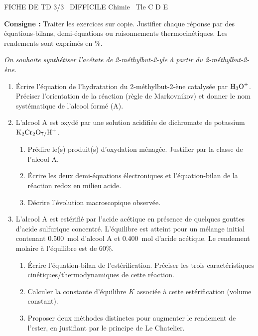 \documentclass[11pt]{article}
\begin{document}
\begin{tcolorbox}[enhanced,colback=popink,colframe=popink,arc=10pt,boxrule=0pt,left=12pt,right=12pt,top=9pt,bottom=9pt]
{\color{white}\popxbold\small FICHE DE TD 3/3 \textbullet\ DIFFICILE \hfill Chimie \textbullet\ Tle C D E\par}
\end{tcolorbox}
\vspace{4pt}
\noindent\textbf{Consigne :} Traiter les exercices sur copie. Justifier chaque réponse par des équations-bilans, demi-équations ou raisonnements thermocinétiques. Les rendements sont exprimés en \%.

\begin{exercice}
\emph{On souhaite synthétiser l'acétate de 2-méthylbut-2-yle à partir du 2-méthylbut-2-ène.}
\begin{enumerate}
    \item Écrire l'équation de l'hydratation du 2-méthylbut-2-ène catalysée par $\ce{H3O+}$. Préciser l'orientation de la réaction (règle de Markovnikov) et donner le nom systématique de l'alcool formé (A).
    \item L'alcool A est oxydé par une solution acidifiée de dichromate de potassium $\ce{K2Cr2O7/H+}$.
    \begin{enumerate}
        \item Prédire le(s) produit(s) d'oxydation ménagée. Justifier par la classe de l'alcool A.
        \item Écrire les deux demi-équations électroniques et l'équation-bilan de la réaction redox en milieu acide.
        \item Décrire l'évolution macroscopique observée.
    \end{enumerate}
    \item L'alcool A est estérifié par l'acide acétique en présence de quelques gouttes d'acide sulfurique concentré. L'équilibre est atteint pour un mélange initial contenant \SI{0,500}{mol} d'alcool A et \SI{0,400}{mol} d'acide acétique. Le rendement molaire à l'équilibre est de 60\%.
    \begin{enumerate}
        \item Écrire l'équation-bilan de l'estérification. Préciser les trois caractéristiques cinétiques/thermodynamiques de cette réaction.
        \item Calculer la constante d'équilibre $K$ associée à cette estérification (volume constant).
        \item Proposer deux méthodes distinctes pour augmenter le rendement de l'ester, en justifiant par le principe de Le Chatelier.
    \end{enumerate}
\end{enumerate}
\end{exercice}
\end{document}
